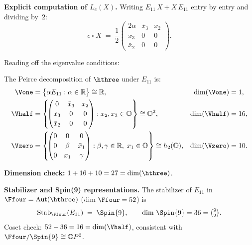 \noindent\textbf{Explicit computation of $L_e(X)$.}  Writing
$E_{11}\, X + X\, E_{11}$ entry by entry and dividing by~$2$:
\begin{equation}\label{eq:L_eX}
  e \circ X \;=\;
  \frac{1}{2}
  \begin{pmatrix}
    2\alpha & \bar{x}_3 & x_2 \\[2pt]
    x_3 & 0 & 0 \\[2pt]
    \bar{x}_2 & 0 & 0
  \end{pmatrix}.
\end{equation}

Reading off the eigenvalue conditions:

\begin{proposition}\label{prop:peirce-spaces}
The Peirce decomposition of $\hthree$ under $E_{11}$ is:
\begin{align}
  \Vone
    &= \bigl\{\alpha E_{11} : \alpha \in \mathbb{R}\bigr\}
    \cong \mathbb{R},
    & \dim(\Vone) &= 1,
    \label{eq:V1} \\
  \Vhalf
    &= \left\{\!
    \begin{pmatrix}
      0 & \bar{x}_3 & x_2 \\[2pt]
      x_3 & 0 & 0 \\[2pt]
      \bar{x}_2 & 0 & 0
    \end{pmatrix}
    : x_2,x_3 \in \mathbb{O}\right\}
    \cong \mathbb{O}^2,
    & \dim(\Vhalf) &= 16,
    \label{eq:V12} \\
  \Vzero
    &= \left\{\!
    \begin{pmatrix}
      0 & 0 & 0 \\[2pt]
      0 & \beta & \bar{x}_1 \\[2pt]
      0 & x_1 & \gamma
    \end{pmatrix}
    : \beta,\gamma\in\mathbb{R},\; x_1\in\mathbb{O}\right\}
    \cong h_2(\mathbb{O}),
    & \dim(\Vzero) &= 10.
    \label{eq:V0}
\end{align}
\end{proposition}

\noindent\textbf{Dimension check:}
$1 + 16 + 10 = 27 = \dim(\hthree)$.\ \checkmark

\medskip
\noindent\textbf{Stabilizer and Spin(9) representations.}
The stabilizer of $E_{11}$ in $\Ffour = \mathrm{Aut}(\hthree)$
($\dim\,\Ffour = 52$)
is~\cite{Baez2002,Yokota2009}
\begin{equation}\label{eq:stab-spin9}
  \mathrm{Stab}_{\Ffour}(E_{11}) \;=\; \Spin{9},
  \qquad
  \dim\,\Spin{9} = 36 = \tbinom{9}{2}.
\end{equation}
Coset check: $52 - 36 = 16 = \dim(\Vhalf)$,
consistent with $\Ffour/\Spin{9} \cong \mathbb{O}P^2$.

